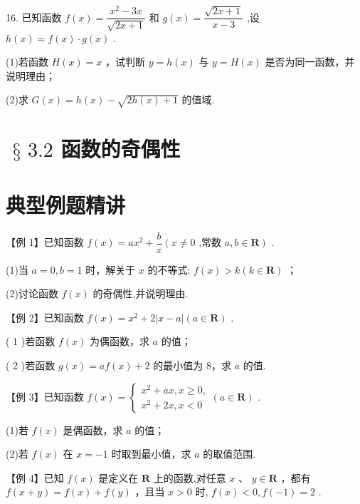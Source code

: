 16. 已知函数 $f\left( x\right)  = \dfrac{{x}^{2} - {3x}}{\sqrt{{2x} + 1}}$ 和 $g\left( x\right)  = \dfrac{\sqrt{{2x} + 1}}{x - 3}$ ,设 $h\left( x\right)  = f\left( x\right)  \cdot  g\left( x\right)$ .

(1)若函数 $H\left( x\right)  = x$ ，试判断 $y = h\left( x\right)$ 与 $y = H\left( x\right)$ 是否为同一函数，并说明理由；

(2)求 $G\left( x\right)  = h\left( x\right)  - \sqrt{{2h}\left( x\right)  + 1}$ 的值域.

\section*{$\text{ § }{3.2}$ 函数的奇偶性}

\section*{典型例题精讲}

【例 1】已知函数 $f\left( x\right)  = a{x}^{2} + \dfrac{b}{x}\left( {x \neq  0}\right.$ ,常数 $\left. {a,b \in  \mathbf{R}}\right)$ .

(1)当 $a = 0,b = 1$ 时，解关于 $x$ 的不等式: $f\left( x\right)  > k\left( {k \in  \mathbf{R}}\right)$ ；

(2)讨论函数 $f\left( x\right)$ 的奇偶性,并说明理由.

【例 2】已知函数 $f\left( x\right)  = {x}^{2} + 2\left| {x - a}\right| \left( {a \in  \mathbf{R}}\right)$ .

( 1 )若函数 $f\left( x\right)$ 为偶函数，求 $a$ 的值；

( 2 )若函数 $g\left( x\right)  = {af}\left( x\right)  + 2$ 的最小值为 8，求 $a$ 的值.

【例 3】已知函数 $f\left( x\right)  = \left\{  {\begin{array}{l} {x}^{2} + {ax},x \geq  0, \\  {x}^{2} + {2x},x < 0 \end{array}\left( {a \in  \mathbf{R}}\right) }\right.$ .

(1)若 $f\left( x\right)$ 是偶函数，求 $a$ 的值；

(2)若 $f\left( x\right)$ 在 $x =  - 1$ 时取到最小值，求 $a$ 的取值范围.

【例 4】已知 $f\left( x\right)$ 是定义在 $\mathbf{R}$ 上的函数,对任意 $x$ 、 $y \in  \mathbf{R}$ ，都有 $f\left( {x + y}\right)  = f\left( x\right)  + f\left( y\right)$ ，且当 $x > 0$ 时, $f\left( x\right)  < 0,f\left( {-1}\right)  = 2$ .

